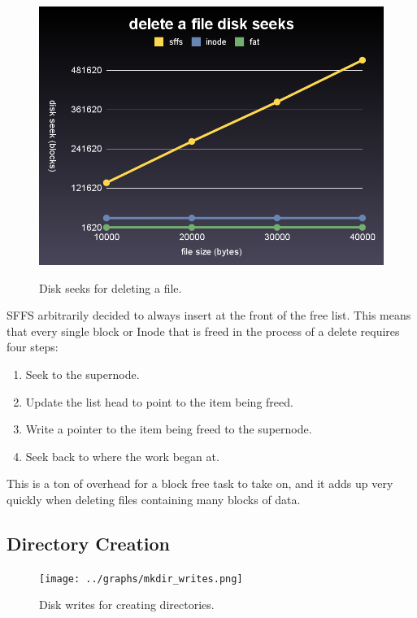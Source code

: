 \documentclass[10pt,twocolumn]{article}
\begin{document}
  \begin{figure}[h]
    \begin{center}
      \includegraphics[scale=0.2]{../graphs/delete_seeks.png}
      \label{fig:delete_seeks}
      \caption{Disk seeks for deleting a file.}
    \end{center}
  \end{figure}

  SFFS arbitrarily decided to always insert at the front of the free list. This
  means that every single block or Inode that is freed in the process of a 
  delete requires four steps:
  \begin{enumerate}
    \item Seek to the supernode.
    \item Update the list head to point to the item being freed.
    \item Write a pointer to the item being freed to the supernode.
    \item Seek back to where the work began at.
  \end{enumerate}

  This is a ton of overhead for a block free task to take on, and it adds up
  very quickly when deleting files containing many blocks of data.
   
\subsection{Directory Creation}
  \begin{figure}[h]
    \begin{center}
      \texttt{[image: ../graphs/mkdir\_writes.png]}
      \label{fig:delete_writes}
      \caption{Disk writes for creating directories.}
    \end{center}
  \end{figure}
\end{document}
